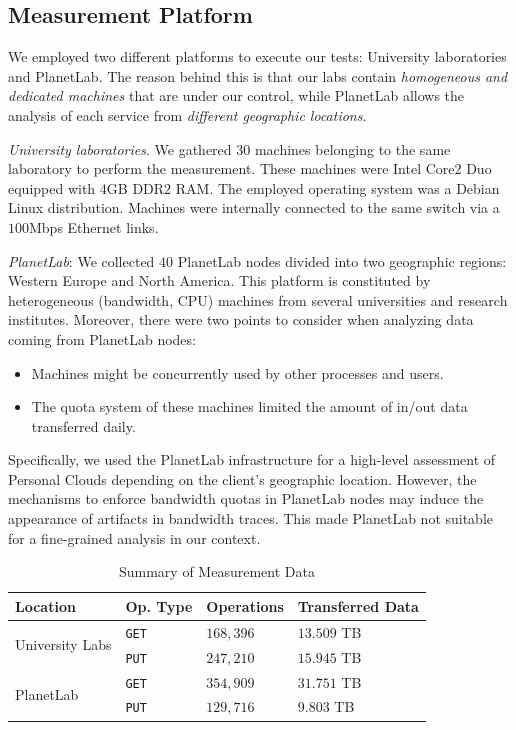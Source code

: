 \subsection{Measurement Platform} 

We employed two different platforms
to execute our tests: University laboratories and PlanetLab.
The reason behind this is that our labs contain
\textit{homogeneous and dedicated machines} that are under our control,
while PlanetLab allows the analysis of each service from \textit{different geographic locations}. 

\textit{University laboratories}. We gathered $30$ machines
belonging to the same laboratory to perform the measurement.
These machines were Intel Core$2$ Duo equipped with $4$GB DDR$2$ RAM. 
The employed operating system was a Debian Linux distribution. 
Machines were internally connected to the same switch via a $100$Mbps Ethernet links.

\textit{PlanetLab}: We collected $40$ PlanetLab nodes divided into
two geographic regions: Western Europe and North America. 
This platform is constituted by heterogeneous (bandwidth, CPU) machines from several
universities and research institutes. Moreover, there were two points to consider
when analyzing data coming from PlanetLab nodes: 
\begin{itemize}
	\item Machines might be concurrently used by other processes and users.
	\item The quota system of these machines limited the amount of in/out data transferred daily. 
\end{itemize}

Specifically, we used the PlanetLab infrastructure for
a high-level assessment of Personal Clouds depending on the 
client's geographic location. 
However, the mechanisms to enforce bandwidth quotas
in PlanetLab nodes may induce the appearance of artifacts 
in bandwidth traces. This made PlanetLab not 
suitable for a fine-grained analysis in our context.
   
\begin{table}%
\begin{center}

\begin{tabular}{|l|l|l|l|}
\hline
Location & Op. Type & Operations & Transferred Data \\ \hline
\multirow{2}{*}{University Labs}
 & \texttt{GET} & $168,396$ & $13.509$ TB\\
 & \texttt{PUT} & $247,210$ & $15.945$ TB\\ \hline
\multirow{2}{*}{PlanetLab}
 & \texttt{GET} & $354,909$ & $31.751$ TB\\
 & \texttt{PUT} & $129,716$ & $9.803$ TB\\ \hline
\end{tabular}
\caption{Summary of Measurement Data}
\vspace{-9mm}
\label{tab:measurement_data}
\end{center}
\end{table}

